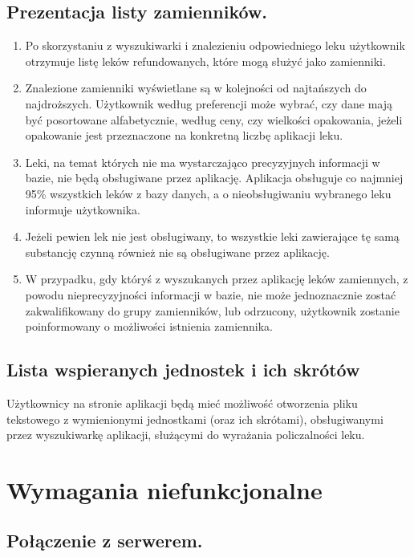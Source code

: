 \documentclass[12pt]{article}
\begin{document}
\subsection{Prezentacja listy zamienników.}

\begin{enumerate}
    \item Po skorzystaniu z wyszukiwarki i znalezieniu odpowiedniego leku
      użytkownik otrzymuje listę leków refundowanych, które mogą służyć jako
      zamienniki.
    \item Znalezione zamienniki wyświetlane są w kolejności od najtańszych do
      najdroższych. Użytkownik według preferencji może wybrać, czy dane mają
      być posortowane alfabetycznie, według ceny, czy wielkości opakowania,
      jeżeli opakowanie jest przeznaczone na konkretną liczbę aplikacji leku.
    \item Leki, na temat których nie ma wystarczająco precyzyjnych informacji
      w bazie, nie będą obsługiwane przez aplikację. Aplikacja obsługuje co
      najmniej 95\% wszystkich leków z bazy danych, a o nieobsługiwaniu
      wybranego leku informuje użytkownika.
    \item Jeżeli pewien lek nie jest obsługiwany, to wszystkie leki zawierające
      tę samą substancję czynną również nie są obsługiwane przez aplikację.
    \item W przypadku, gdy któryś z wyszukanych przez aplikację leków
      zamiennych, z powodu nieprecyzyjności informacji w bazie, nie może
      jednoznacznie zostać zakwalifikowany do grupy zamienników, lub odrzucony,
      użytkownik zostanie poinformowany o możliwości istnienia zamiennika.
\end{enumerate}

\subsection{Lista wspieranych jednostek i ich skrótów}

Użytkownicy na stronie aplikacji będą mieć możliwość otworzenia pliku
tekstowego z wymienionymi jednostkami (oraz ich skrótami), obsługiwanymi przez
wyszukiwarkę aplikacji, służącymi do wyrażania policzalności leku.

\section{Wymagania niefunkcjonalne}

\subsection{Połączenie z serwerem.}
\end{document}
